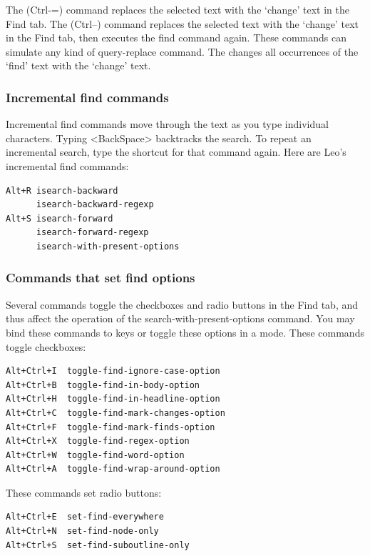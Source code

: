 \documentclass[a4paper,10pt,english]{sphinxmanual}
\begin{document}
The  (Ctrl-=) command replaces the selected text with the
`change' text in the Find tab. The  (Ctrl--) command
replaces the selected text with the `change' text in the Find tab, then
executes the find command again. These commands can simulate any kind of
query-replace command. The  changes all occurrences of the
`find' text with the `change' text.


\subsubsection{Incremental find commands}
\label{commands:incremental-find-commands}
Incremental find commands move through the text as you type individual
characters. Typing \textless{}BackSpace\textgreater{} backtracks the search. To repeat an
incremental search, type the shortcut for that command again. Here are
Leo's incremental find commands:

\begin{Verbatim}[commandchars=\\\{\}]
Alt+R isearch-backward
      isearch-backward-regexp
Alt+S isearch-forward
      isearch-forward-regexp
      isearch-with-present-options
\end{Verbatim}


\subsubsection{Commands that set find options}
\label{commands:commands-that-set-find-options}
Several commands toggle the checkboxes and radio buttons in the Find tab,
and thus affect the operation of the search-with-present-options command.
You may bind these commands to keys or toggle these options in a mode.
These commands toggle checkboxes:

\begin{Verbatim}[commandchars=\\\{\}]
Alt+Ctrl+I  toggle-find-ignore-case-option
Alt+Ctrl+B  toggle-find-in-body-option
Alt+Ctrl+H  toggle-find-in-headline-option
Alt+Ctrl+C  toggle-find-mark-changes-option
Alt+Ctrl+F  toggle-find-mark-finds-option
Alt+Ctrl+X  toggle-find-regex-option
Alt+Ctrl+W  toggle-find-word-option
Alt+Ctrl+A  toggle-find-wrap-around-option
\end{Verbatim}

These commands set radio buttons:

\begin{Verbatim}[commandchars=\\\{\}]
Alt+Ctrl+E  set-find-everywhere
Alt+Ctrl+N  set-find-node-only
Alt+Ctrl+S  set-find-suboutline-only
\end{Verbatim}
\end{document}
